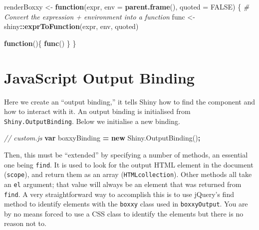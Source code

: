 \documentclass[
  10pt,
]{krantz}
\makeatletter
\newenvironment{Shaded}{\begin{snugshade}}{\end{snugshade}}
\newcommand{\AttributeTok}[1]{\textcolor[rgb]{0.61,0.61,0.61}{#1}}
\newcommand{\CommentTok}[1]{\textcolor[rgb]{0.37,0.37,0.37}{\textit{#1}}}
\newcommand{\ControlFlowTok}[1]{\textcolor[rgb]{0.27,0.27,0.27}{\textbf{#1}}}
\newcommand{\DataTypeTok}[1]{\textcolor[rgb]{0.27,0.27,0.27}{#1}}
\newcommand{\KeywordTok}[1]{\textcolor[rgb]{0.27,0.27,0.27}{\textbf{#1}}}
\newcommand{\NormalTok}[1]{#1}
\newcommand{\OperatorTok}[1]{\textcolor[rgb]{0.43,0.43,0.43}{\textbf{#1}}}
\newcommand{\OtherTok}[1]{\textcolor[rgb]{0.37,0.37,0.37}{#1}}
\newcommand{\StringTok}[1]{\textcolor[rgb]{0.5,0.5,0.5}{#1}}
\newcommand{\VariableTok}[1]{\textcolor[rgb]{0,0,0}{#1}}
\newenvironment{kframe}{%
\medskip{}
\setlength{\fboxsep}{.8em}
 \def\at@end@of@kframe{}%
 \ifinner\ifhmode%
  \def\at@end@of@kframe{\end{minipage}}%
  \begin{minipage}{\columnwidth}%
 \fi\fi%
 \def\FrameCommand##1{\hskip\@totalleftmargin \hskip-\fboxsep
 \colorbox{shadecolor}{##1}\hskip-\fboxsep
     \hskip-\linewidth \hskip-\@totalleftmargin \hskip\columnwidth}%
 \MakeFramed {\advance\hsize-\width
   \@totalleftmargin\z@ \linewidth\hsize
   \@setminipage}}%
 {\par\unskip\endMakeFramed%
 \at@end@of@kframe}
\renewenvironment{Shaded}{\begin{kframe}}{\end{kframe}}
\makeatother
\begin{document}
\begin{Shaded}
\begin{Highlighting}[]
\NormalTok{renderBoxxy <{-}}\StringTok{ }\ControlFlowTok{function}\NormalTok{(expr, }\DataTypeTok{env =} \KeywordTok{parent.frame}\NormalTok{(), }
  \DataTypeTok{quoted =} \OtherTok{FALSE}\NormalTok{) \{}
  \CommentTok{\# Convert the expression + environment into a function}
\NormalTok{  func <{-}}\StringTok{ }\NormalTok{shiny}\OperatorTok{::}\KeywordTok{exprToFunction}\NormalTok{(expr, env, quoted)}

  \ControlFlowTok{function}\NormalTok{()\{}
    \KeywordTok{func}\NormalTok{()}
\NormalTok{  \}}
\NormalTok{\}}
\end{Highlighting}
\end{Shaded}

\hypertarget{shiny-output-binding}{%
\section{JavaScript Output Binding}\label{shiny-output-binding}}

Here we create an ``output binding,'' it tells Shiny how to find the component and how to interact with it. An output binding is initialised from \texttt{Shiny.OutputBinding}. Below we initialise a new binding.

\begin{Shaded}
\begin{Highlighting}[]
\CommentTok{// custom.js}
\KeywordTok{var}\NormalTok{ boxxyBinding }\OperatorTok{=} \KeywordTok{new} \VariableTok{Shiny}\NormalTok{.}\AttributeTok{OutputBinding}\NormalTok{()}\OperatorTok{;}
\end{Highlighting}
\end{Shaded}

Then, this must be ``extended'' by specifying a number of methods, an essential one being \texttt{find}. It is used to look for the output HTML element in the document (\texttt{scope}), and return them as an array (\texttt{HTMLcollection}). Other methods all take an \texttt{el} argument; that value will always be an element that was returned from \texttt{find}. A very straightforward way to accomplish this is to use jQuery's find method to identify elements with the \texttt{boxxy} class used in \texttt{boxxyOutput}. You are by no means forced to use a CSS class to identify the elements but there is no reason not to.
\end{document}
